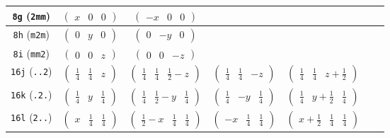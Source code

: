 \documentclass[fleqn,9pt,landscape]{jsarticle}
\begin{document}
\begin{center}
\begin{longtable}{ccccccc}
{\tt 8g} ({\tt 2mm}) & $ \begin{pmatrix} x & 0 & 0 \end{pmatrix} $ & $ \begin{pmatrix} - x & 0 & 0 \end{pmatrix} $ & $  $ & $  $ & $  $ & $  $ \\ \hline
{\tt 8h} ({\tt m2m}) & $ \begin{pmatrix} 0 & y & 0 \end{pmatrix} $ & $ \begin{pmatrix} 0 & - y & 0 \end{pmatrix} $ & $  $ & $  $ & $  $ & $  $ \\ \hline
{\tt 8i} ({\tt mm2}) & $ \begin{pmatrix} 0 & 0 & z \end{pmatrix} $ & $ \begin{pmatrix} 0 & 0 & - z \end{pmatrix} $ & $  $ & $  $ & $  $ & $  $ \\ \hline
{\tt 16j} ({\tt ..2}) & $ \begin{pmatrix} \frac{1}{4} & \frac{1}{4} & z \end{pmatrix} $ & $ \begin{pmatrix} \frac{1}{4} & \frac{1}{4} & \frac{1}{2} - z \end{pmatrix} $ & $ \begin{pmatrix} \frac{1}{4} & \frac{1}{4} & - z \end{pmatrix} $ & $ \begin{pmatrix} \frac{1}{4} & \frac{1}{4} & z + \frac{1}{2} \end{pmatrix} $ & $  $ & $  $ \\ \hline
{\tt 16k} ({\tt .2.}) & $ \begin{pmatrix} \frac{1}{4} & y & \frac{1}{4} \end{pmatrix} $ & $ \begin{pmatrix} \frac{1}{4} & \frac{1}{2} - y & \frac{1}{4} \end{pmatrix} $ & $ \begin{pmatrix} \frac{1}{4} & - y & \frac{1}{4} \end{pmatrix} $ & $ \begin{pmatrix} \frac{1}{4} & y + \frac{1}{2} & \frac{1}{4} \end{pmatrix} $ & $  $ & $  $ \\ \hline
{\tt 16l} ({\tt 2..}) & $ \begin{pmatrix} x & \frac{1}{4} & \frac{1}{4} \end{pmatrix} $ & $ \begin{pmatrix} \frac{1}{2} - x & \frac{1}{4} & \frac{1}{4} \end{pmatrix} $ & $ \begin{pmatrix} - x & \frac{1}{4} & \frac{1}{4} \end{pmatrix} $ & $ \begin{pmatrix} x + \frac{1}{2} & \frac{1}{4} & \frac{1}{4} \end{pmatrix} $ & $  $ & $  $ \\ \hline

\end{longtable}
\end{center}
\end{document}
